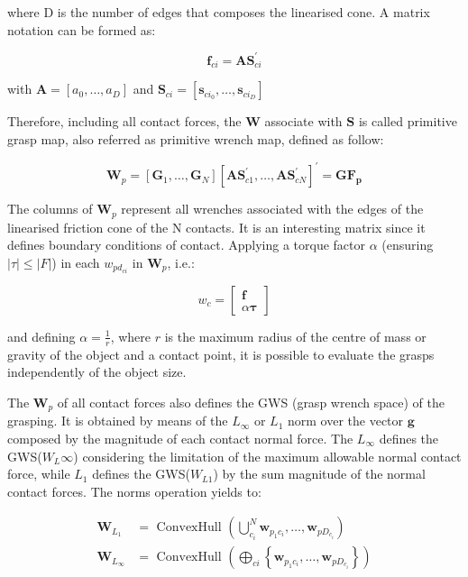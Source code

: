 where D is the number of edges that composes the linearised cone. A matrix notation can be formed as:

\begin{equation}
	\mathbf{f}_{ci}=\mathbf{A} \mathbf{S}_{ci}^{\prime}
\end{equation}

with $\mathbf{A}=\left[a_{0}, \ldots, a_{D}\right]$ and $\mathbf{S}_{ci}=\left[\mathbf{s}_{ci_0}, \ldots, \mathbf{s}_{ci_D}\right]$

Therefore, including all contact forces, the $\mathbf{W}$ associate with $\mathbf{S}$ is called primitive grasp map, also referred as primitive wrench map, defined as follow:

\begin{equation}
	\mathbf{W}_{p}=\left[\mathbf{G}_{1}, \ldots, \mathbf{G}_{N}\right]\left[\mathbf{A} \mathbf{S}_{c 1}^{\prime}, \ldots, \mathbf{A} \mathbf{S}_{c N}^{\prime}\right]^{\prime}=\mathbf{G} \mathbf{F}_{\mathbf{p}}
\end{equation}

The columns of $\mathbf{W}_{p}$ represent all wrenches associated with the edges of the linearised friction cone of the N contacts. It is an interesting matrix since it defines boundary conditions of contact. Applying a torque factor $\alpha$ (ensuring $|\tau| \leq|F|$) in each $w_{pd_{ci}}$ in $\mathbf{W}_{p}$, i.e.:

\begin{equation}
	w_{c}=\left[\begin{array}{c}
		\boldsymbol{f} \\
		\alpha \boldsymbol{\tau}
	\end{array}\right]
\end{equation}

and defining $\alpha=\frac{1}{r}$, where $r$ is the maximum radius of the centre of mass or gravity of the object and a contact point, it is possible to evaluate the grasps independently of the object size.

The $\mathbf{W}_p$ of all contact forces also defines the GWS (grasp wrench space) of the grasping. It is obtained by means of the $L_\infty$ or $L_1$ norm over the vector $\mathbf{g}$ composed by the magnitude of each contact normal force. The $L_\infty$ defines the GWS($W_L\infty$) considering the limitation of the maximum allowable normal contact force, while $L_1$ defines the GWS($W_{L1}$) by the sum magnitude of the normal contact forces. The norms operation yields to:


\begin{equation}
\begin{aligned}
\mathbf{W}_{L_{1}} &=\text { ConvexHull }\left(\bigcup_{c_i}^{N} \mathbf{w}_{p_1 c_i}, \ldots, \mathbf{w}_{p D_{c_i}}\right) \\
\mathbf{W}_{L_{\infty}} &=\text { ConvexHull }\left(\bigoplus_{c i}\left\{\mathbf{w}_{p_1 c_i}, \ldots, \mathbf{w}_{p D_{c_i}}\right\}\right)
\end{aligned}
\end{equation}

